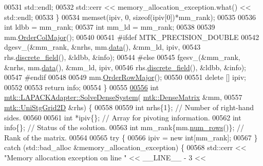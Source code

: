 \begin{DoxyCode}
00531       std::endl;
00532     std::cerr << memory\_allocation\_exception.what() << std::endl;
00533   \}
00534   memset(ipiv, 0, \textcolor{keyword}{sizeof}(ipiv[0])*mm\_rank);
00535 
00536   \textcolor{keywordtype}{int} ldbb = mm\_rank;
00537   \textcolor{keywordtype}{int} mm\_ld = mm\_rank;
00538 
00539   mm.\hyperlink{classmtk_1_1DenseMatrix_a59b9bea24acf39dca64e8549b3527463}{OrderColMajor}();
00540 
00541 \textcolor{preprocessor}{  #ifdef MTK\_PRECISION\_DOUBLE}
00542   dgesv\_(&mm\_rank, &nrhs, mm.\hyperlink{classmtk_1_1DenseMatrix_a0c33b8a9e01d157c61ddbdf807c25d84}{data}(), &mm\_ld, ipiv,
00543          rhs.\hyperlink{classmtk_1_1UniStgGrid1D_ab9c3f9ee2ac76a351b01e4abfede4d19}{discrete\_field}(), &ldbb, &info);
00544 \textcolor{preprocessor}{  #else}
00545   fgesv\_(&mm\_rank, &nrhs, mm.\hyperlink{classmtk_1_1DenseMatrix_a0c33b8a9e01d157c61ddbdf807c25d84}{data}(), &mm\_ld, ipiv,
00546          rhs.\hyperlink{classmtk_1_1UniStgGrid1D_ab9c3f9ee2ac76a351b01e4abfede4d19}{discrete\_field}(), &ldbb, &info);
00547 \textcolor{preprocessor}{  #endif}
00548 
00549   mm.\hyperlink{classmtk_1_1DenseMatrix_ac2949efba3e8278335d45418c85433e4}{OrderRowMajor}();
00550 
00551   \textcolor{keyword}{delete} [] ipiv;
00552 
00553   \textcolor{keywordflow}{return} info;
00554 \}
00555 
\hypertarget{mtk__lapack__adapter_8cc_source_l00556}{}\hyperlink{classmtk_1_1LAPACKAdapter_a6c040471a1e9256bafa74e3603ff7bf5}{00556} \textcolor{keywordtype}{int} \hyperlink{classmtk_1_1LAPACKAdapter_a7428bccf74fd4a4af68fb7233846da22}{mtk::LAPACKAdapter::SolveDenseSystem}(
      \hyperlink{classmtk_1_1DenseMatrix}{mtk::DenseMatrix} &mm,
00557                                          \hyperlink{classmtk_1_1UniStgGrid2D}{mtk::UniStgGrid2D} &rhs) \{
00558 
00559   \textcolor{keywordtype}{int} nrhs\{1\};  \textcolor{comment}{// Number of right-hand sides.}
00560 
00561   \textcolor{keywordtype}{int} *ipiv\{\};                \textcolor{comment}{// Array for pivoting information.}
00562   \textcolor{keywordtype}{int} info\{\};                 \textcolor{comment}{// Status of the solution.}
00563   \textcolor{keywordtype}{int} mm\_rank\{mm.\hyperlink{classmtk_1_1DenseMatrix_a53f3afb3b6a8d21854458aaa9663cc74}{num\_rows}()\}; \textcolor{comment}{// Rank of the matrix.}
00564 
00565   \textcolor{keywordflow}{try} \{
00566     ipiv = \textcolor{keyword}{new} \textcolor{keywordtype}{int}[mm\_rank];
00567   \} \textcolor{keywordflow}{catch} (std::bad\_alloc &memory\_allocation\_exception) \{
00568     std::cerr << \textcolor{stringliteral}{"Memory allocation exception on line "} << \_\_LINE\_\_ - 3 <<

\end{DoxyCode}
